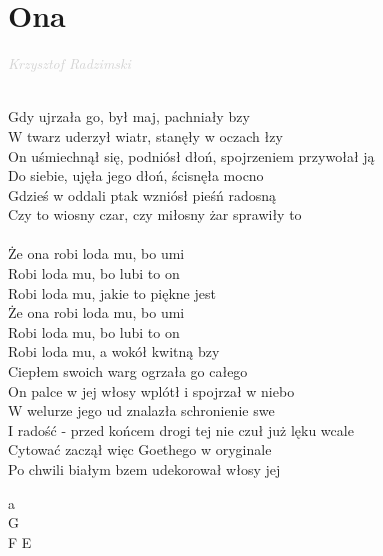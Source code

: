\documentclass[a5paper, 10pt]{book}
\begin{document}
\section{Ona}\textcolor{lightgray}{\textit{Krzysztof Radzimski}}\\~\\
\begin{minipage}[t]{0.8\textwidth}
  Gdy ujrzała go, był maj, pachniały bzy\\
  W twarz uderzył wiatr, stanęły w oczach łzy\\
  On uśmiechnął się, podniósł dłoń, spojrzeniem przywołał ją\\
  Do siebie, ujęła jego dłoń, ścisnęła mocno\\
  Gdzieś w oddali ptak wzniósł pieśń radosną\\
  Czy to wiosny czar, czy miłosny żar sprawiły to\\
  \\
  \hspace*{5mm}Że ona robi loda mu, bo umi\\
  \hspace*{5mm}Robi loda mu, bo lubi to on\\
  \hspace*{5mm}Robi loda mu, jakie to piękne jest\\
  \hspace*{5mm}Że ona robi loda mu, bo umi\\
  \hspace*{5mm}Robi loda mu, bo lubi to on\\
  \hspace*{5mm}Robi loda mu, a wokół kwitną bzy\\

  Ciepłem swoich warg ogrzała go całego\\
  On palce w jej włosy wplótł i spojrzał w niebo\\
  W welurze jego ud znalazła schronienie swe\\
  I radość - przed końcem drogi tej nie czuł już lęku wcale\\
  Cytować zaczął więc Goethego w oryginale\\
  Po chwili białym bzem udekorował włosy jej\\

\end{minipage}
\begin{minipage}[t]{0.2\textwidth}
  a\\
  G\\
  F E\\
\end{minipage}
\end{document}
